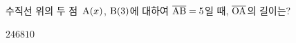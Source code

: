 수직선 위의 두 점~$\mathrm{A}(x)$, $\mathrm{B}(3)$에 대하여 $\overline{\mathrm{AB}}=5$일 때, $\overline{\mathrm{OA}}$의 길이는? 
\begin{choices32}{$2$}{$4$}{$6$}{$8$}{$10$}\end{choices32}
